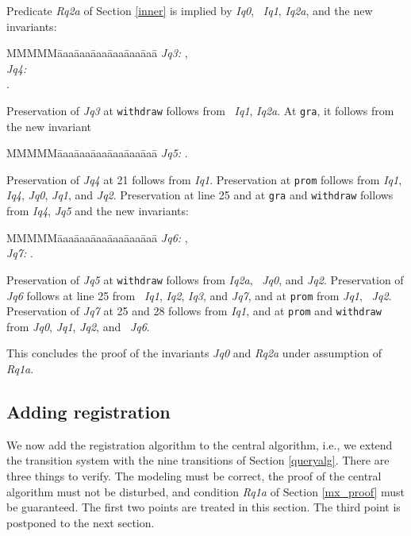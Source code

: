 \documentclass[10pt]{article} \usepackage[english]{babel}
\newenvironment{tab}{\begin{tabbing}
MMMMM\=aaa\=aaa\=aaa\=aaa\=aaa\=aaa\= \kill}{\end{tabbing}}
\def\S #1/{\mbox {\textsl{#1}}}
\def\T #1/{\mbox {\texttt{#1}}}
\begin{document}
Predicate \S Rq2a/ of Section \ref{inner} is implied by \S Iq0/, \S
Iq1/, \S Iq2a/, and the new invariants:
\begin{tab}
\S Jq3:/ \>  ,\\
\S Jq4:/ \> \\
\>  .
\end{tab}

Preservation of \S Jq3/ at \T withdraw/ follows from \S
Iq1/, \S Iq2a/.  At \T gra/, it follows from the new invariant 
\begin{tab}
  \S Jq5:/ \>  .
\end{tab}

Preservation of \S Jq4/ at 21 follows from \S Iq1/.  Preservation at
\T prom/ follows from \S Iq1/, \S Iq4/, \S Jq0/, \S Jq1/, and \S Jq2/.
Preservation at line 25 and at \T gra/ and \T withdraw/ follows from
\S Iq4/, \S Jq5/ and the new invariants:
\begin{tab}
  \S Jq6:/ \>  ,\\
  \S Jq7:/ \>  .
\end{tab}

Preservation of \S Jq5/ at \T withdraw/ follows from \S Iq2a/, \S
Jq0/, and \S Jq2/.  Preservation of \S Jq6/ follows at line 25 from \S
Iq1/, \S Iq2/, \S Iq3/, and \S Jq7/, and at \T prom/ from \S Jq1/, \S
Jq2/.  Preservation of \S Jq7/ at 25 and 28 follows from \S Iq1/, and
at \T prom/ and \T withdraw/ from \S Jq0/, \S Jq1/, \S Jq2/, and \S
Jq6/.

This concludes the proof of the invariants \S Jq0/ and \S Rq2a/ under
assumption of \S Rq1a/.

\subsection {Adding registration} \label{queryadd}

We now add the registration algorithm to the central algorithm, i.e.,
we extend the transition system with the nine transitions of Section
\ref{queryalg}.  There are three things to verify. The modeling must
be correct, the proof of the central algorithm must not be disturbed,
and condition \S Rq1a/ of Section \ref{mx_proof} must be guaranteed.
The first two points are treated in this section.  The third point is
postponed to the next section.
\end{document}
